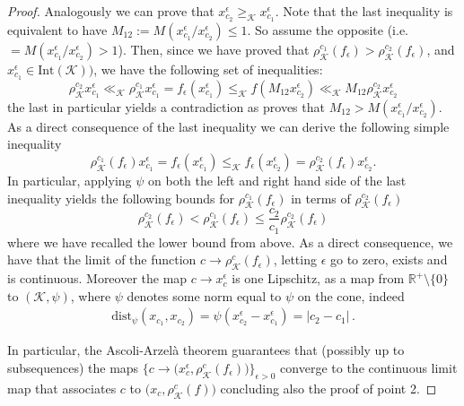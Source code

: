 \documentclass{article}
\newcommand{\R}{\mathbb{R}}
\newcommand{\cradius}{\rho_{\cone}}
\newcommand{\cone}{\mathcal{K}}
\newcommand{\interior}{\mathrm{Int}}
\newcommand{\cgeq}{\geq_{\cone}}
\newcommand{\cleq}{\leq_{\cone}}
\newcommand{\cll}{\ll_{\cone}}
\begin{document}
\begin{proof}
%
Analogously we can prove that $x_{c_2}^\epsilon\cgeq x_{c_1}^\epsilon$. Note that the last inequality is equivalent to have $M_{12}:=M(x_{c_1}^\epsilon/x_{c_2}^\epsilon)\leq 1$. So assume the opposite (i.e. $=M(x_{c_1}^\epsilon/x_{c_2}^\epsilon)>1$). Then, since we have proved that $\cradius^{c_1}(f_{\epsilon})>\cradius^{c_2}(f_{\epsilon})$, and $x^{\epsilon}_{c_1}\in \interior(\cone)
)$, we have the following set of inequalities:
\begin{equation}
    \cradius^{c_2}x^{\epsilon}_{c_1}\cll \cradius^{c_1}x^{\epsilon}_{c_1}=f_{\epsilon}(x_{c_1}^{\epsilon})\cleq f(M_{12}x_{c_2}^{\epsilon})\cll M_{12}\cradius^{c_2}x_{c_2}^\epsilon
\end{equation}
the last in particular yields a contradiction as proves that $M_{12}>M(x_{c_1}^\epsilon/x_{c_2}^\epsilon)$.
%
As a direct consequence of the last inequality we can derive the following simple inequality
\begin{equation}
  \cradius^{c_1}(f_\epsilon)x_{c_1}^\epsilon= f_\epsilon(x_{c_1}^\epsilon)\cleq f_\epsilon(x_{c_2}^\epsilon)= \cradius^{c_2}(f_\epsilon) x_{c_2}^\epsilon.
\end{equation}
%
In particular, applying $\psi$ on both the left and right hand side of the last inequality yields the following bounds for $\cradius^{c_1}(f_\epsilon)$ in terms of $\cradius^{c_2}(f_\epsilon)$
\begin{equation}
   \cradius^{c_2}(f_\epsilon) < \cradius^{c_1}(f_\epsilon)\leq \frac{c_2}{c_1}\cradius^{c_2}(f_\epsilon)
\end{equation}
where we have recalled the lower bound from above.
As a direct consequence, we have that the limit of the function $c\rightarrow \cradius^c(f_\epsilon)$, letting $\epsilon$ go to zero, exists and is continuous. Moreover the map $ c\rightarrow x_c^\epsilon $ is one Lipschitz, as a map from $\R^+\setminus\{0\}$ to $(\cone,\psi)$, where $\psi$ denotes some norm equal to $\psi$ on the cone, indeed
\begin{equation}
\begin{aligned}
    \mathrm{dist}_{\psi}(x_{c_1},x_{c_2})= \psi(x_{c_2}^\epsilon-x_{c_1}^\epsilon) = |c_2-c_1|\,.
\end{aligned}
\end{equation}

% 
In particular, the Ascoli-Arzelà theorem guarantees that (possibly up to subsequences) the maps $\{c\rightarrow \big(x_c^\epsilon,\cradius^c(f_\epsilon)\big) \}_{\epsilon>0}$ converge to the continuous limit map that associates $c$ to $\big(x_c,\cradius^c(f)\big)$ concluding also the proof of point 2.
%
\end{proof}
%
%
\end{document}
